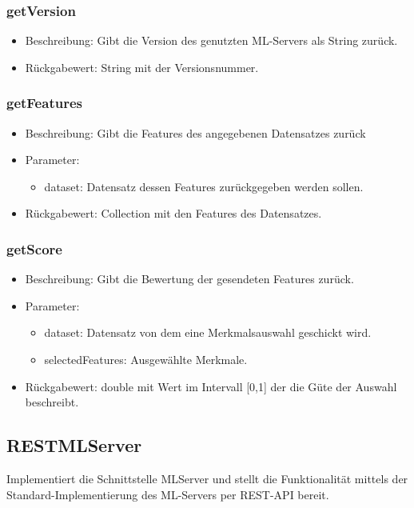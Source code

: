 \documentclass[a4paper]{scrreprt}
\begin{document}
    \subsubsection{getVersion}
    \begin{itemize}
        \item Beschreibung: Gibt die Version des genutzten ML-Servers als String zurück.
        \item Rückgabewert: String mit der Versionsnummer.
    \end{itemize}

    \subsubsection{getFeatures}
    \begin{itemize}
        \item Beschreibung: Gibt die Features des angegebenen Datensatzes zurück
        \item Parameter:
            \begin{itemize}
                \item dataset: Datensatz dessen Features zurückgegeben werden sollen.
            \end{itemize}
        \item Rückgabewert: Collection mit den Features des Datensatzes.
    \end{itemize}

    \subsubsection{getScore}
    \begin{itemize}
        \item Beschreibung: Gibt die Bewertung der gesendeten Features zurück.
        \item Parameter:
            \begin{itemize}
                \item dataset: Datensatz von dem eine Merkmalsauswahl geschickt wird.
                \item selectedFeatures: Ausgewählte Merkmale.
            \end{itemize}
        \item Rückgabewert: double mit Wert im Intervall [0,1] der die Güte der Auswahl beschreibt.
    \end{itemize}

    \subsection{RESTMLServer}
    Implementiert die Schnittstelle MLServer und stellt die Funktionalität mittels der Standard-Implementierung des ML-Servers per REST-API bereit.
\end{document}
